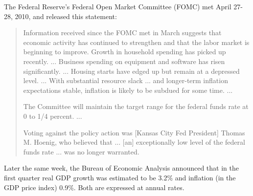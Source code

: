 \documentclass[letterpaper,12pt]{exam}
\begin{document}
\begin{questions}
%
The Federal Reserve's Federal Open Market Committee (FOMC)
met April 27-28, 2010, and released this statement:  
% 
\begin{quote}
Information received since the FOMC met in March suggests that economic activity has continued to strengthen and that the labor market is beginning to improve. Growth in household spending has picked up recently.  ... 
Business spending on equipment and software has risen significantly. ...
Housing starts have edged up but remain at a depressed level. ...  
With substantial resource slack ... and longer-term inflation expectations stable, inflation is likely to be subdued for some time. ...

The Committee will maintain the target range for the federal funds rate at 0 to 1/4 percent.  ...

Voting against the policy action was [Kansas City Fed President] 
Thomas M. Hoenig, who believed that ... [an] exceptionally low level 
of the federal funds rate ...  was no longer warranted.  
\end{quote}
%
Later the same week, the Bureau of Economic Analysis announced that 
in the first quarter real GDP growth was estimated to be 3.2\% and 
inflation (in the GDP price index) 0.9\%.
Both are expressed at annual rates.



\end{questions}
\end{document}
